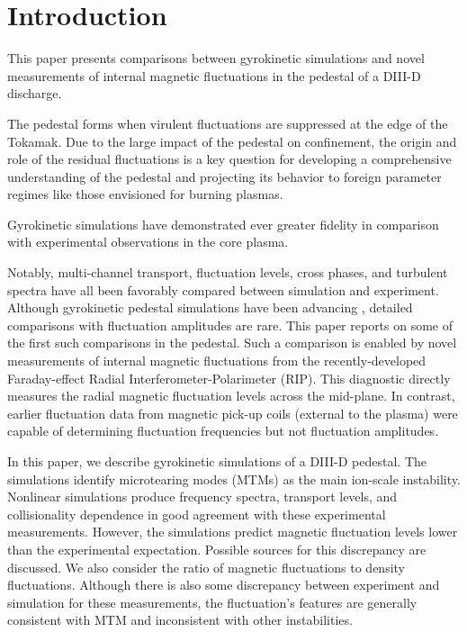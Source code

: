 \documentclass[
 aip,
 amsmath,amssymb,
 reprint
]{revtex4-1}
\begin{document}
\maketitle

\section{Introduction}

This paper presents comparisons between gyrokinetic simulations and novel measurements of internal magnetic fluctuations in the pedestal of a DIII-D discharge.

The pedestal forms when virulent fluctuations are suppressed at the edge of the Tokamak.  Due to the large impact of the pedestal on confinement, the origin and role of the residual fluctuations is a key question for developing a comprehensive understanding of the pedestal and projecting its behavior to foreign parameter regimes like those envisioned for burning plasmas.  

Gyrokinetic simulations have demonstrated ever greater fidelity in comparison with experimental observations in the core plasma.~\cite{Core,doi:10.1063/1.4919022,osti_1779308,doi:10.1063/1.2895408,doi:10.13182/FST15-182} 

Notably, multi-channel transport, fluctuation levels, cross phases, and turbulent spectra have all been favorably compared between simulation and experiment.  Although gyrokinetic pedestal simulations have been advancing \cite{Haskey_2022,PhysRevLett.108.135002,Hatch_2016,Hatch_2017,PhysRevLett.123.115001,doi:10.1063/1.5124986,Hatch_2021,osti_1776857,doi:10.1063/5.0037246,curie_thesis}
, detailed comparisons with fluctuation amplitudes are rare.  This paper reports on some of the first such comparisons in the pedestal.  Such a comparison is enabled by novel measurements of internal magnetic fluctuations from the recently-developed Faraday-effect Radial Interferometer-Polarimeter (RIP)\cite{rip}.  This diagnostic directly measures the radial magnetic fluctuation levels across the mid-plane.  In contrast, earlier fluctuation data from magnetic pick-up coils (external to the plasma) were capable of determining fluctuation frequencies but not fluctuation amplitudes.  

In this paper, we describe gyrokinetic simulations \cite{Jenko_GENE,GORLER20117053}
of a DIII-D pedestal.  The simulations identify microtearing modes (MTMs) as the main ion-scale instability.  Nonlinear simulations produce frequency spectra, transport levels, and collisionality dependence in good agreement with these experimental measurements.  However, the simulations predict magnetic fluctuation levels lower than the experimental expectation.  Possible sources for this discrepancy are discussed.  We also consider the ratio of magnetic fluctuations to density fluctuations.  Although there is also some discrepancy between experiment and simulation for these measurements, the fluctuation's features are generally consistent with MTM and inconsistent with other instabilities.  
    
\end{document}
